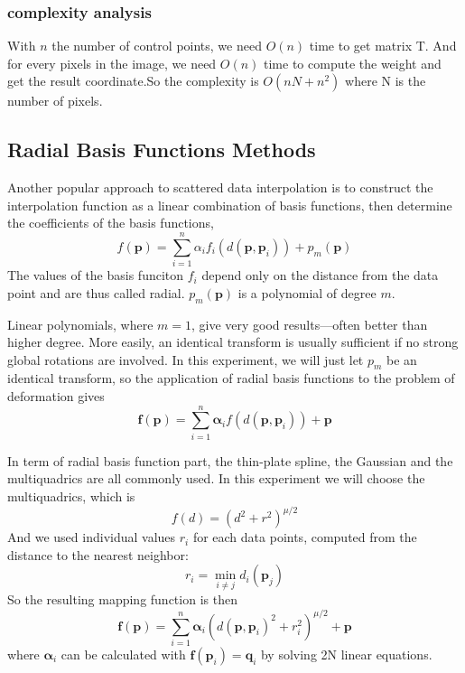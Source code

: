 \documentclass[12pt]{article}
\begin{document}
\subsubsection*{complexity analysis}
With $n$ the number of control points, we need $O(n)$ time to get matrix T. And for every pixels in the image, we need $O(n)$ time to compute the weight and get the result coordinate.So the complexity is $O(nN+n^2)$ where N is the number of pixels.


\subsection{Radial Basis Functions Methods}
Another popular approach to scattered data interpolation is to construct the interpolation function as a linear combination of basis functions, then determine the coefficients of the basis functions,
\begin{equation}
    f(\mathbf{p})=\sum_{i=1}^n\alpha_if_i(d(\mathbf{p},\mathbf{p}_i))+p_m(\mathbf{p})
\end{equation}
The values of the basis funciton $f_i$ depend only on the distance from the data point and are thus called radial. $p_m(\mathbf{p})$ is a polynomial of degree $m$.

Linear polynomials, where $m=1$, give very good results---often better than higher degree. More easily, an identical transform is usually sufficient if no strong global rotations are involved. In this experiment, we will just let $p_m$ be an identical transform, so the application of radial basis functions to the problem of deformation gives
\begin{equation}
    \mathbf{f}(\mathbf{p})=\sum_{i=1}^n\bm{\alpha}_if(d(\mathbf{p},\mathbf{p}_i))+\mathbf{p}
\end{equation}

In term of radial basis function part, the thin-plate spline, the Gaussian and the multiquadrics are all commonly used. In this experiment we will choose the multiquadrics, which is
\begin{equation}
    f(d)=(d^2+r^2)^{\mu/2}
\end{equation}
And we used individual values $r_i$ for each data points, computed from the distance to the nearest neighbor:
\begin{equation}
    r_i=\min_{i\neq j}d_i(\mathbf{p}_j)
\end{equation}
So the resulting mapping function is then
\begin{equation}
    \mathbf{f}(\mathbf{p})=\sum_{i=1}^n\bm{\alpha}_i(d(\mathbf{p},\mathbf{p}_i)^2+r_i^2)^{\mu/2}+\mathbf{p}
\end{equation}
where $\bm{\alpha}_i$ can be calculated with $\mathbf{f}(\mathbf{p}_i)=\mathbf{q}_i$ by solving 2N linear equations.
\end{document}

